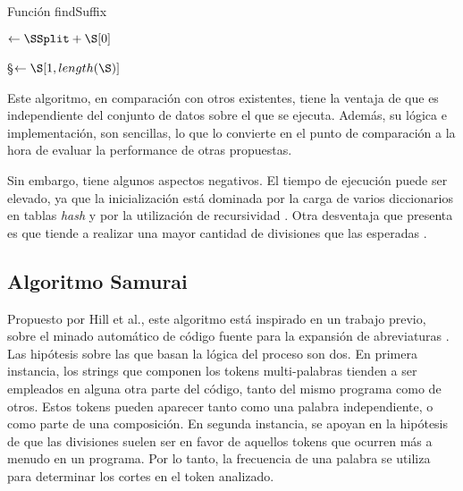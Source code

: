 \begin{algorithm}
\caption{Función findSuffix}
\label{funFindSuffix}
\DontPrintSemicolon
  
  
  
  \BlankLine
  
  \BlankLine
  
  \BlankLine
  \SSplit $\leftarrow \SSplit + \S[0] $\;
  
  \BlankLine
  \S $\leftarrow \S[1, length(\S)]$\;
  
  \BlankLine
  \KwRet \FindSuffixSSSplit
\end{algorithm}

Este algoritmo, en comparación con otros existentes, tiene la ventaja de que es independiente del conjunto de datos sobre el que se ejecuta. Además, su lógica e implementación, son sencillas, lo que lo convierte en el punto de comparación a la hora de evaluar la performance de otras propuestas.

Sin embargo, tiene algunos aspectos negativos. El tiempo de ejecución puede ser elevado, ya que la inicialización está dominada por la carga de varios diccionarios en tablas \textit{hash} y por la utilización de recursividad \cite{FieldBinkleyLawrie06}.
Otra desventaja que presenta es que tiende a realizar una mayor cantidad de divisiones que las esperadas \cite{Feild06anempirical}.

\subsection{Algoritmo Samurai}
Propuesto por Hill et al., este algoritmo está inspirado en un trabajo previo, sobre el minado automático de código fuente para la expansión de abreviaturas \cite{Hill:2008:AAM:1370750.1370771}.
Las hipótesis sobre las que basan la lógica del proceso son dos. 
En primera instancia, los strings que componen los tokens multi-palabras tienden a ser empleados en alguna otra parte del código, tanto del mismo programa como de otros. Estos tokens pueden aparecer tanto como una palabra independiente, o como parte de una composición.
En segunda instancia, se apoyan en la hipótesis de que las divisiones suelen ser en favor de aquellos tokens que ocurren más a menudo en un programa. Por lo tanto, la frecuencia de una palabra se utiliza para determinar los cortes en el token analizado.

